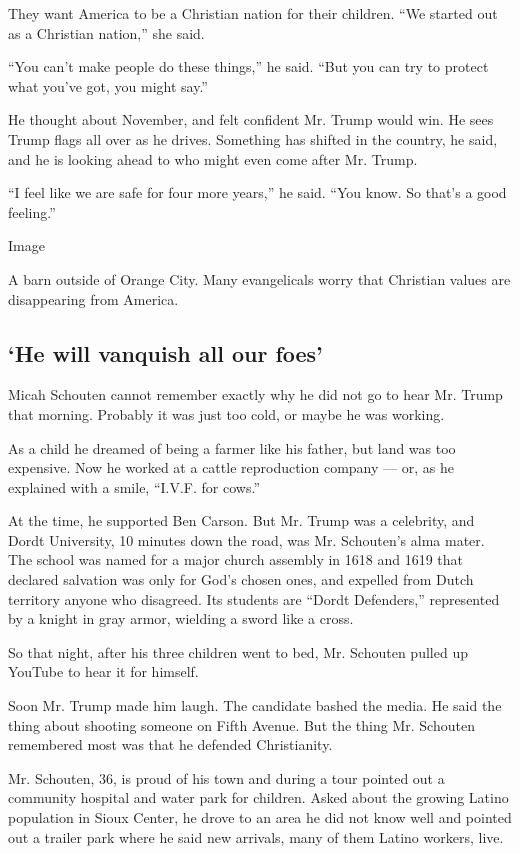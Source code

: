 They want America to be a Christian nation for their children. ``We
started out as a Christian nation,'' she said.

``You can't make people do these things,'' he said. ``But you can try to
protect what you've got, you might say.''

He thought about November, and felt confident Mr. Trump would win. He
sees Trump flags all over as he drives. Something has shifted in the
country, he said, and he is looking ahead to who might even come after
Mr. Trump.

``I feel like we are safe for four more years,'' he said. ``You know. So
that's a good feeling.''

Image

A barn outside of Orange City. Many evangelicals worry that Christian
values are disappearing from America.

\hypertarget{he-will-vanquish-all-our-foes}{%
\subsection{`He will vanquish all our
foes'}\label{he-will-vanquish-all-our-foes}}

Micah Schouten cannot remember exactly why he did not go to hear Mr.
Trump that morning. Probably it was just too cold, or maybe he was
working.

As a child he dreamed of being a farmer like his father, but land was
too expensive. Now he worked at a cattle reproduction company --- or, as
he explained with a smile, ``I.V.F. for cows.''

At the time, he supported Ben Carson. But Mr. Trump was a celebrity, and
Dordt University, 10 minutes down the road, was Mr. Schouten's alma
mater. The school was named for a major church assembly in 1618 and 1619
that declared salvation was only for God's chosen ones, and expelled
from Dutch territory anyone who disagreed. Its students are ``Dordt
Defenders,'' represented by a knight in gray armor, wielding a sword
like a cross.

So that night, after his three children went to bed, Mr. Schouten pulled
up YouTube to hear it for himself.

Soon Mr. Trump made him laugh. The candidate bashed the media. He said
the thing about shooting someone on Fifth Avenue. But the thing Mr.
Schouten remembered most was that he defended Christianity.

Mr. Schouten, 36, is proud of his town and during a tour pointed out a
community hospital and water park for children. Asked about the growing
Latino population in Sioux Center, he drove to an area he did not know
well and pointed out a trailer park where he said new arrivals, many of
them Latino workers, live.

